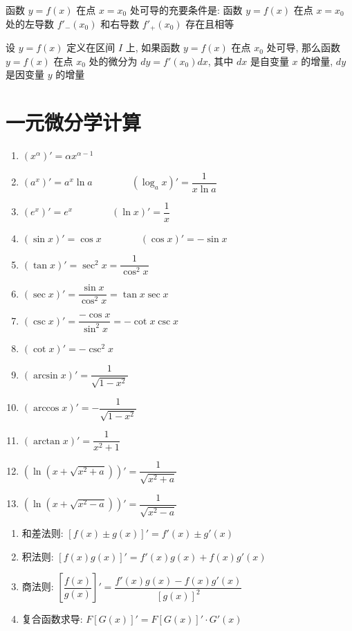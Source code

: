 \begin{theorem}[导数存在充要条件]
	函数 $y=f(x)$ 在点 $x=x_{0}$ 处可导的充要条件是: 函数 $y=f(x)$ 在点 $x=x_{0}$ 处的左导数 $f'_{-}(x_{0})$ 和右导数 $f'_{+}(x_{0})$ 存在且相等
\end{theorem}

\begin{definition}[微分]
	设 $y=f(x)$ 定义在区间 $I$ 上, 如果函数 $y=f(x)$ 在点 $x_{0}$ 处可导, 那么函数 $y=f(x)$ 在点 $x_{0}$ 处的微分为 $dy=f'(x_{0})dx$, 其中 $dx$ 是自变量 $x$ 的增量, $dy$ 是因变量 $y$ 的增量
\end{definition}
\section{一元微分学计算}
\begin{theorem}[基本求导公式]
	\begin{enumerate}
		\item $(x^{\alpha})'= \alpha x^{\alpha-1}$
		\item $(a^{x})'= a^{x}\ln a \qquad\qquad (\log_{a}x)'= \dfrac{1}{x\ln a}$
		\item $(e^{x})'= e^{x}\qquad \qquad (\ln x)' = \dfrac{1}{x}$
		\item $(\sin x)' = \cos x\qquad \qquad (\cos x)' = -\sin x$
		\item $(\tan x)' = \sec^{2} x = \dfrac{1}{\cos^{2} x}$
		\item $(\sec x)' = \dfrac{\sin x}{\cos^{2}x} = \tan x\sec x$
		\item $(\csc x)' = \dfrac{-\cos x}{\sin^{2} x} = -\cot x\csc x$
		\item $(\cot x)' = -\csc^{2} x$
		\item $(\arcsin x)' = \dfrac{1}{\sqrt{1-x^{2}}}$
		\item $(\arccos x)' = -\dfrac{1}{\sqrt{1-x^{2}}}$
		\item $(\arctan x)' = \dfrac{1}{x^{2}+1}$
		\item $\left(\ln(x+\sqrt{x^{2}+a})\right)' = \dfrac{1}{\sqrt{x^{2}+a}}$
		\item $\left(\ln(x+\sqrt{x^{2}-a})\right)' = \dfrac{1}{\sqrt{x^{2}-a}}$
	\end{enumerate}
\end{theorem}

\begin{theorem}[导数四则运算]
	\begin{enumerate}
		\item 和差法则: $[f(x)\pm g(x)]' = f'(x) \pm g'(x)$
		\item 积法则: $[f(x)g(x)]' = f'(x)g(x) + f(x)g'(x)$
		\item 商法则: $\left[\dfrac{f(x)}{g(x)}\right]' = \dfrac{f'(x)g(x) - f(x)g'(x)}{[g(x)]^{2}}$
		\item 复合函数求导: $F[G(x)]' = F[G(x)]'\cdot G'(x)$
	\end{enumerate}
\end{theorem}

